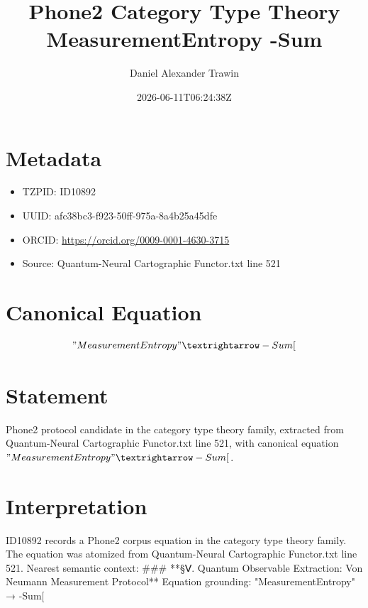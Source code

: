 \documentclass[11pt]{article}
\title{Phone2 Category Type Theory MeasurementEntropy -Sum}
\author{Daniel Alexander Trawin}
\date{2026-06-11T06:24:38Z}
\begin{document}
\maketitle
\section*{Metadata}
\begin{itemize}
\item TZPID: ID10892
\item UUID: afc38bc3-f923-50ff-975a-8a4b25a45dfe
\item ORCID: \url{https://orcid.org/0009-0001-4630-3715}
\item Source: Quantum-Neural Cartographic Functor.txt line 521
\end{itemize}
\section*{Canonical Equation}
\[
"MeasurementEntropy" → -Sum[
\]
\section*{Statement}
Phone2 protocol candidate in the category type theory family, extracted from Quantum-Neural Cartographic Functor.txt line 521, with canonical equation $"MeasurementEntropy" → -Sum[$.
\section*{Interpretation}
ID10892 records a Phone2 corpus equation in the category type theory family. The equation was atomized from Quantum-Neural Cartographic Functor.txt line 521. Nearest semantic context: ### **§Ⅴ. Quantum Observable Extraction: Von Neumann Measurement Protocol** Equation grounding: "MeasurementEntropy" → -Sum[
\end{document}
